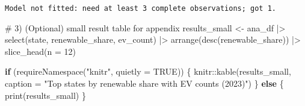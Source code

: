 \documentclass[
  english,
  letterpaper,
  DIV=11,
  numbers=noendperiod]{scrartcl}
\newenvironment{Shaded}{\begin{snugshade}}{\end{snugshade}}
\newcommand{\AttributeTok}[1]{\textcolor[rgb]{0.40,0.45,0.13}{#1}}
\newcommand{\CommentTok}[1]{\textcolor[rgb]{0.37,0.37,0.37}{#1}}
\newcommand{\ConstantTok}[1]{\textcolor[rgb]{0.56,0.35,0.01}{#1}}
\newcommand{\ControlFlowTok}[1]{\textcolor[rgb]{0.00,0.23,0.31}{\textbf{#1}}}
\newcommand{\DecValTok}[1]{\textcolor[rgb]{0.68,0.00,0.00}{#1}}
\newcommand{\FunctionTok}[1]{\textcolor[rgb]{0.28,0.35,0.67}{#1}}
\newcommand{\NormalTok}[1]{\textcolor[rgb]{0.00,0.23,0.31}{#1}}
\newcommand{\OtherTok}[1]{\textcolor[rgb]{0.00,0.23,0.31}{#1}}
\newcommand{\SpecialCharTok}[1]{\textcolor[rgb]{0.37,0.37,0.37}{#1}}
\newcommand{\StringTok}[1]{\textcolor[rgb]{0.13,0.47,0.30}{#1}}
\begin{document}
\begin{Shaded}
\end{Shaded}

\begin{verbatim}
Model not fitted: need at least 3 complete observations; got 1.
\end{verbatim}

\begin{Shaded}
\begin{Highlighting}[]
\CommentTok{\# 3) (Optional) small result table for appendix}
\NormalTok{results\_small }\OtherTok{\textless{}{-}}
\NormalTok{  ana\_df }\SpecialCharTok{|\textgreater{}}
  \FunctionTok{select}\NormalTok{(state, renewable\_share, ev\_count) }\SpecialCharTok{|\textgreater{}}
  \FunctionTok{arrange}\NormalTok{(}\FunctionTok{desc}\NormalTok{(renewable\_share)) }\SpecialCharTok{|\textgreater{}}
  \FunctionTok{slice\_head}\NormalTok{(}\AttributeTok{n =} \DecValTok{12}\NormalTok{)}

\ControlFlowTok{if}\NormalTok{ (}\FunctionTok{requireNamespace}\NormalTok{(}\StringTok{"knitr"}\NormalTok{, }\AttributeTok{quietly =} \ConstantTok{TRUE}\NormalTok{)) \{}
\NormalTok{  knitr}\SpecialCharTok{::}\FunctionTok{kable}\NormalTok{(results\_small, }\AttributeTok{caption =} \StringTok{"Top states by renewable share with EV counts (2023)"}\NormalTok{)}
\NormalTok{\} }\ControlFlowTok{else}\NormalTok{ \{}
  \FunctionTok{print}\NormalTok{(results\_small)}
\NormalTok{\}}
\end{Highlighting}
\end{Shaded}
\end{document}
